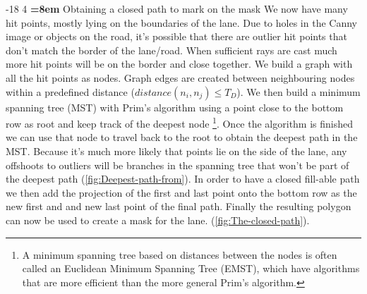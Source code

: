 \documentclass[oneside,english]{llncs}
\makeatletter
\renewcommand\subsubsection{\@startsection{subsubsection}{3}{\z@}%
                       {-18\p@ \@plus -4\p@ \@minus -4\p@}%
                       {4\p@ \@plus 2\p@ \@minus 2\p@}%
                       {\normalfont\normalsize\bfseries\boldmath
                        \rightskip=\z@ \@plus 8em\pretolerance=10000 }}
\makeatother
\begin{document}
\subsubsection{Obtaining a closed path to mark on the mask}
We now have many hit points, mostly lying on the boundaries of the lane. Due to holes in the Canny image or objects on the road, it's possible that there are outlier hit points that don't match the border of the lane/road. When sufficient rays are cast much more hit points will be on the border and close together. We build a graph with all the hit points as nodes. Graph edges are created between neighbouring nodes within a predefined distance ($distance(n_{i},n_{j}) \leqslant T_{D}$). We then build a minimum spanning tree (MST) with Prim's algorithm \cite{key-5} using a point close to the bottom row as root and keep track of the deepest node
\footnote{A minimum spanning tree based on distances between the nodes is often called an Euclidean Minimum Spanning Tree (EMST), which have algorithms that are more efficient than the more general Prim's algorithm.}. Once the algorithm is finished we can use that node to travel back to the root to obtain the deepest path in the MST. Because it's much more likely that points lie on the side of the lane, any offshoots to outliers will be branches in the spanning tree that won't be part of the deepest path (\ref{fig:Deepest-path-from}). In order to have a closed fill-able path we then add the projection of the first and last point onto the bottom row as the new first and and new last point of the final path. Finally the resulting polygon can now be used to create a mask for the lane. (\ref{fig:The-closed-path}).
\end{document}
